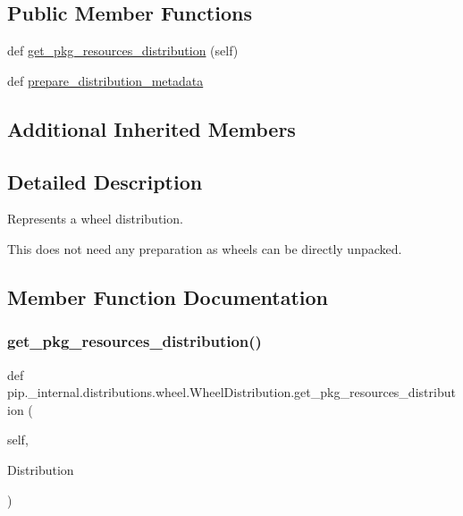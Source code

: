 \subsection*{Public Member Functions}
\begin{DoxyCompactItemize}
\item 
def \hyperlink{classpip_1_1__internal_1_1distributions_1_1wheel_1_1WheelDistribution_a81411c79b4ceeef7081eba6ec4046ec9}{get\+\_\+pkg\+\_\+resources\+\_\+distribution} (self)
\item 
def \hyperlink{classpip_1_1__internal_1_1distributions_1_1wheel_1_1WheelDistribution_a08370c64031629dcd8591ae907bdd5d9}{prepare\+\_\+distribution\+\_\+metadata}
\end{DoxyCompactItemize}
\subsection*{Additional Inherited Members}


\subsection{Detailed Description}
\begin{DoxyVerb}Represents a wheel distribution.

This does not need any preparation as wheels can be directly unpacked.
\end{DoxyVerb}
 

\subsection{Member Function Documentation}
\mbox{\label{classpip_1_1__internal_1_1distributions_1_1wheel_1_1WheelDistribution_a81411c79b4ceeef7081eba6ec4046ec9}} 
\subsubsection{\texorpdfstring{get\+\_\+pkg\+\_\+resources\+\_\+distribution()}{get\_pkg\_resources\_distribution()}}
{\footnotesize\ttfamily def pip.\+\_\+internal.\+distributions.\+wheel.\+Wheel\+Distribution.\+get\+\_\+pkg\+\_\+resources\+\_\+distribution (\begin{DoxyParamCaption}\item[{}]{self,  }\item[{}]{Distribution }\end{DoxyParamCaption})}

